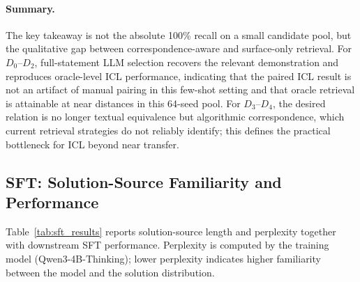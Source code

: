 \documentclass[]{bytedance_seed}
\theoremstyle{plain}
\theoremstyle{definition}
\theoremstyle{remark}
\begin{document}
\paragraph{Summary.}
The key takeaway is not the absolute 100\% recall on a small candidate pool, but the qualitative gap between correspondence-aware and surface-only retrieval. For $D_0$--$D_2$, full-statement LLM selection recovers the relevant demonstration and reproduces oracle-level ICL performance, indicating that the paired ICL result is not an artifact of manual pairing in this few-shot setting and that oracle retrieval is attainable at near distances in this 64-seed pool. For $D_3$--$D_4$, the desired relation is no longer textual equivalence but algorithmic correspondence, which current retrieval strategies do not reliably identify; this defines the practical bottleneck for ICL beyond near transfer.


\iffalse
\subsection{SFT: Solution-Source Familiarity and Performance}
\label{app:perplexity}

Table~\ref{tab:sft_results} reports solution-source length and perplexity together with downstream SFT performance. Perplexity is computed by the training model (Qwen3-4B-Thinking); lower perplexity indicates higher familiarity between the model and the solution distribution.
\end{document}

